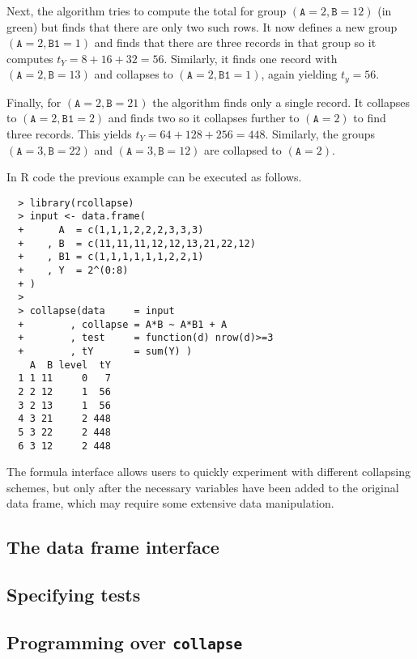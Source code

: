 \documentclass[11pt, fleqn]{article}
\begin{document}
Next, the algorithm tries to compute the total for group
$(\texttt{A}=2,\texttt{B}=12)$ (in green) but finds that there are only two
such rows. It now defines a new group $(\texttt{A}=2,\texttt{B1}=1)$ and finds
that there are three records in that group so it computes $t_Y=8+16+32=56$.
Similarly, it finds one record with $(\texttt{A}=2,\texttt{B}=13)$ and
collapses to $(\texttt{A}=2,\texttt{B1}=1)$, again yielding $t_y=56$.

Finally, for $(\texttt{A}=2,\texttt{B}=21)$ the algorithm finds only a single
record. It collapses to $(\texttt{A}=2,\texttt{B1}=2)$ and finds two so it
collapses further to $(\texttt{A}=2)$ to find three records.  This yields
$t_Y=64+128+256=448$. Similarly, the groups $(\texttt{A}=3, \texttt{B}=22)$ and
$(\texttt{A}=3,\texttt{B}=12)$ are collapsed to $(\texttt{A}=2)$.

In R code the previous example can be executed as follows.
\begin{verbatim}
  > library(rcollapse)
  > input <- data.frame(
  +      A  = c(1,1,1,2,2,2,3,3,3)
  +    , B  = c(11,11,11,12,12,13,21,22,12)
  +    , B1 = c(1,1,1,1,1,1,2,2,1)
  +    , Y  = 2^(0:8)
  + )
  >
  > collapse(data     = input
  +        , collapse = A*B ~ A*B1 + A
  +        , test     = function(d) nrow(d)>=3
  +        , tY       = sum(Y) )
    A  B level  tY
  1 1 11     0   7
  2 2 12     1  56
  3 2 13     1  56
  4 3 21     2 448
  5 3 22     2 448
  6 3 12     2 448
\end{verbatim}
%
The formula interface allows users to quickly experiment with different
collapsing schemes, but only after the necessary variables have been added to
the original data frame, which may require some extensive data manipulation.

\subsection{The data frame interface}





\subsection{Specifying tests}

\subsection{Programming over \texttt{collapse}}
\end{document}
